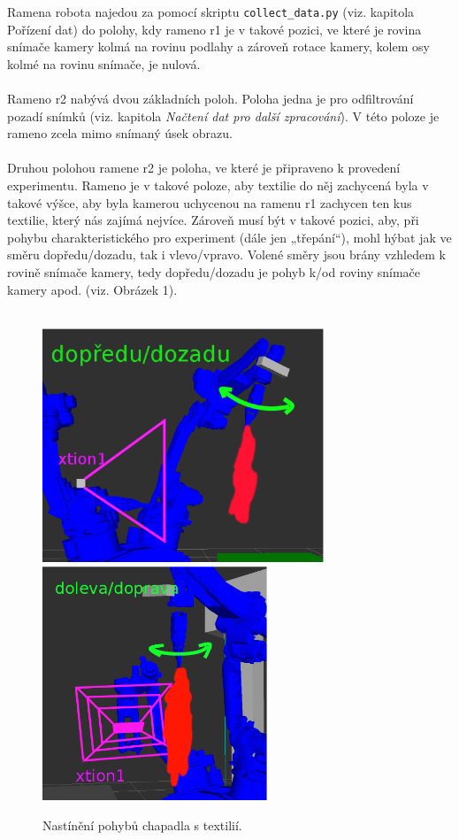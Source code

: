 \documentclass[10pt,a4paper,titlepage,oneside]{report}
\begin{document}
Ramena robota najedou za pomocí skriptu \verb|collect_data.py| (viz. kapitola Pořízení dat) do polohy, kdy rameno r1 je v takové pozici, ve které je rovina snímače kamery kolmá na rovinu podlahy a zároveň rotace kamery, kolem osy kolmé na rovinu snímače, je nulová.\\
\\
Rameno r2 nabývá dvou základních poloh. Poloha jedna je pro odfiltrování pozadí snímků (viz. kapitola \textit{Načtení dat pro další zpracování}). V této poloze je rameno zcela mimo snímaný úsek obrazu.\\
\\ 
Druhou polohou ramene r2 je poloha, ve které je připraveno k provedení experimentu. Rameno je v takové poloze, aby textilie do něj zachycená byla v takové výšce, aby byla kamerou uchycenou na ramenu r1 zachycen ten kus textilie, který nás zajímá nejvíce. Zároveň musí být v takové pozici, aby, při pohybu charakteristického pro experiment (dále jen „třepání“), mohl hýbat jak ve směru dopředu/dozadu, tak i vlevo/vpravo. Volené směry jsou brány vzhledem k rovině snímače kamery, tedy dopředu/dozadu je pohyb k/od roviny snímače kamery apod. (viz. Obrázek 1).\\
\\
\begin{figure}[H]
	\centering  	
  	\includegraphics[height=7cm]{pictures/obrazek1.eps}
  	\includegraphics[height=7cm]{pictures/obrazek2.eps}
  	\caption{Nastínění pohybů chapadla s textilií.}
  	\label{fig:obrazek1}
\end{figure}
\end{document}
